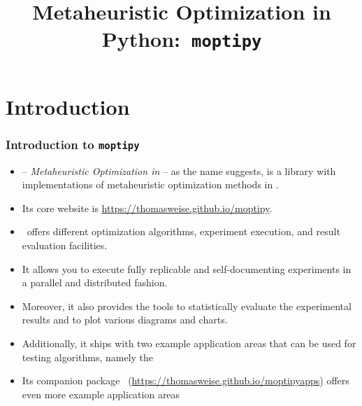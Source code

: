 \documentclass[aspectratio=169,mathserif,notheorems]{beamer}%
\title{Metaheuristic Optimization in Python:~\texttt{moptipy}}%
\begin{document}
%
\startPresentation%
%
\section{Introduction}%
%
\begin{frame}%
\frametitle{Introduction to \texttt{moptipy}}%
%
\begin{itemize}%
%
\item \moptipy\cite{WW2023RSDEWASSAA} -- \emph{Metaheuristic Optimization in \python} -- as the name suggests, is a library with implementations of \gls{metaheuristic} optimization methods in \python\cite{programmingWithPython}.%
%
\item<2-> Its core website is \url{https://thomasweise.github.io/moptipy}.%
%
\item<3-> \moptipy\ offers different optimization algorithms, experiment execution, and result evaluation facilities.%
%
\item<4-> It allows you to execute fully replicable and self-documenting experiments in a parallel and distributed fashion.%
%
\item<5-> Moreover, it also provides the tools to statistically evaluate the experimental results and to plot various diagrams and charts.%
%
\item<6-> Additionally, it ships with two example application areas that can be used for testing algorithms, namely the \cite{W2019JRDAIOTJSSP,WLCW2021SJSSPWUABFGS,WWLC2021FFAMOAIUBTOTOFV}%
%
\item<8-> Its companion package ~(\url{https://thomasweise.github.io/moptipyapps}) offers even more example application areas%
\end{itemize}%
%
%
%
\end{frame}%
%
\end{document}
